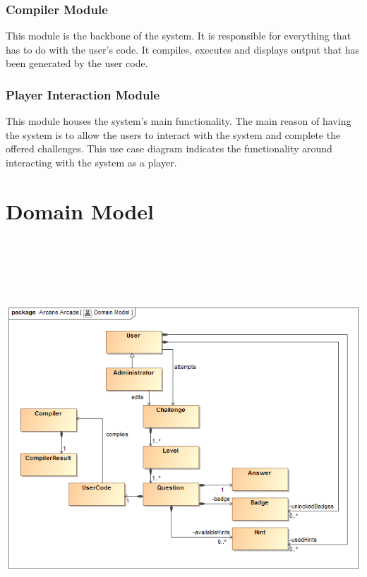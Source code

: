 \documentclass[english]{article}
\begin{document}
		\subsubsection{Compiler Module}
		This module is the backbone of the system. It is responsible for everything that has to do with the user's code. It compiles, executes and displays output that has been generated by the user code.
		
		\subsubsection{Player Interaction Module}
		This module houses the system's main functionality. The main reason of having the system is to allow the users to interact with the system and complete the offered challenges. This use case diagram indicates the functionality around interacting with the system as a player.
		
		
		\section{Domain Model}
		 \includegraphics[width=15cm,height=15cm,keepaspectratio]{domainModel v2.png}
	\iffalse	
	
\end{document}
